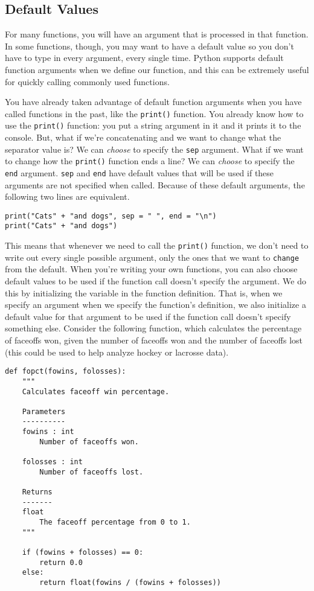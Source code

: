 \subsection{Default Values}
For many functions, you will have an argument that is processed in that function. In some functions, though, you may want to have a default value so you don't have to type in every argument, every single time. Python supports default function arguments when we define our function, and this can be extremely useful for quickly calling commonly used functions.\par
You have already taken advantage of default function arguments when you have called functions in the past, like the \verb|print()| function. You already know how to use the \verb|print()| function: you put a string argument in it and it prints it to the console. But, what if we're concatenating and we want to change what the separator value is? We can \textit{choose} to specify the \verb|sep| argument. What if we want to change how the \verb|print()| function ends a line? We can \textit{choose} to specify the \verb|end| argument. \verb|sep| and \verb|end| have default values that will be used if these arguments are not specified when called. Because of these default arguments, the following two lines are equivalent.\par
\begin{lstlisting}[style=pippython]
print("Cats" + "and dogs", sep = " ", end = "\n")
print("Cats" + "and dogs")
\end{lstlisting}
This means that whenever we need to call the \verb|print()| function, we don't need to write out every single possible argument, only the ones that we want to \verb|change| from the default. When you're writing your own functions, you can also choose default values to be used if the function call doesn't specify the argument. We do this by initializing the variable in the function definition. That is, when we specify an argument when we specify the function's definition, we also initialize a default value for that argument to be used if the function call doesn't specify something else. Consider the following function, which calculates the percentage of faceoffs won, given the number of faceoffs won and the number of faceoffs lost (this could be used to help analyze hockey or lacrosse data).\par
\begin{lstlisting}[style=pippython]
def fopct(fowins, folosses):
	"""
	Calculates faceoff win percentage.
	
	Parameters
	----------
	fowins : int
		Number of faceoffs won.

	folosses : int
		Number of faceoffs lost.

	Returns
	-------
	float
		The faceoff percentage from 0 to 1.
	"""
	
	if (fowins + folosses) == 0:
		return 0.0
	else:
		return float(fowins / (fowins + folosses))
\end{lstlisting}

